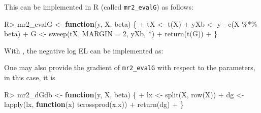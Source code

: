 \documentclass[article]{jss}
\newenvironment{Shaded}{\begin{snugshade}}{\end{snugshade}}
\newcommand{\AttributeTok}[1]{\textcolor[rgb]{0.77,0.63,0.00}{#1}}
\newcommand{\ControlFlowTok}[1]{\textcolor[rgb]{0.13,0.29,0.53}{\textbf{#1}}}
\newcommand{\DecValTok}[1]{\textcolor[rgb]{0.00,0.00,0.81}{#1}}
\newcommand{\FunctionTok}[1]{\textcolor[rgb]{0.00,0.00,0.00}{#1}}
\newcommand{\NormalTok}[1]{#1}
\newcommand{\OtherTok}[1]{\textcolor[rgb]{0.56,0.35,0.01}{#1}}
\newcommand{\SpecialCharTok}[1]{\textcolor[rgb]{0.00,0.00,0.00}{#1}}
\newcommand{\StringTok}[1]{\textcolor[rgb]{0.31,0.60,0.02}{#1}}
\renewcommand{\|}{\,|\,}
\begin{document}
This can be implemented in R (called \texttt{mr2\_evalG}) as follows:

\begin{Shaded}
\begin{Highlighting}[]
\NormalTok{R}\SpecialCharTok{\textgreater{}}\NormalTok{ mr2\_evalG }\OtherTok{\textless{}{-}} \ControlFlowTok{function}\NormalTok{(y, X, beta) \{}
\SpecialCharTok{+}\NormalTok{    tX }\OtherTok{\textless{}{-}} \FunctionTok{t}\NormalTok{(X)}
\SpecialCharTok{+}\NormalTok{    yXb }\OtherTok{\textless{}{-}}\NormalTok{ y }\SpecialCharTok{{-}} \FunctionTok{c}\NormalTok{(X }\SpecialCharTok{\%*\%}\NormalTok{ beta)}
\SpecialCharTok{+}\NormalTok{    G }\OtherTok{\textless{}{-}} \FunctionTok{sweep}\NormalTok{(tX, }\AttributeTok{MARGIN =} \DecValTok{2}\NormalTok{, yXb, }\StringTok{\textasciigrave{}}\AttributeTok{*}\StringTok{\textasciigrave{}}\NormalTok{)}
\SpecialCharTok{+}    \FunctionTok{return}\NormalTok{(}\FunctionTok{t}\NormalTok{(G))}
\SpecialCharTok{+}\NormalTok{  \}}
\end{Highlighting}
\end{Shaded}

With , the negative log EL can be implemented as:

\begin{Shaded}
\end{Shaded}

One may also provide the gradient of \texttt{mr2\_evalG} with respect to the parameters, in this case, it is

\begin{Shaded}
\begin{Highlighting}[]
\NormalTok{R}\SpecialCharTok{\textgreater{}}\NormalTok{ mr2\_dGdb }\OtherTok{\textless{}{-}} \ControlFlowTok{function}\NormalTok{(y, X, beta) \{}
\SpecialCharTok{+}\NormalTok{    lx }\OtherTok{\textless{}{-}} \FunctionTok{split}\NormalTok{(X, }\FunctionTok{row}\NormalTok{(X))}
\SpecialCharTok{+}\NormalTok{    dg }\OtherTok{\textless{}{-}} \FunctionTok{lapply}\NormalTok{(lx, }\ControlFlowTok{function}\NormalTok{(x) }\FunctionTok{tcrossprod}\NormalTok{(x,x))}
\SpecialCharTok{+}    \FunctionTok{return}\NormalTok{(dg)}
\SpecialCharTok{+}\NormalTok{  \}}
\end{Highlighting}
\end{Shaded}
\end{document}
